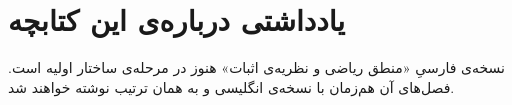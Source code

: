 \chapter*{یادداشتی درباره‌ی این کتابچه}

نسخه‌ی فارسیِ «منطق ریاضی و نظریه‌ی اثبات» هنوز در مرحله‌ی ساختار اولیه است. فصل‌های آن هم‌زمان با نسخه‌ی انگلیسی و به همان ترتیب نوشته خواهند شد.
